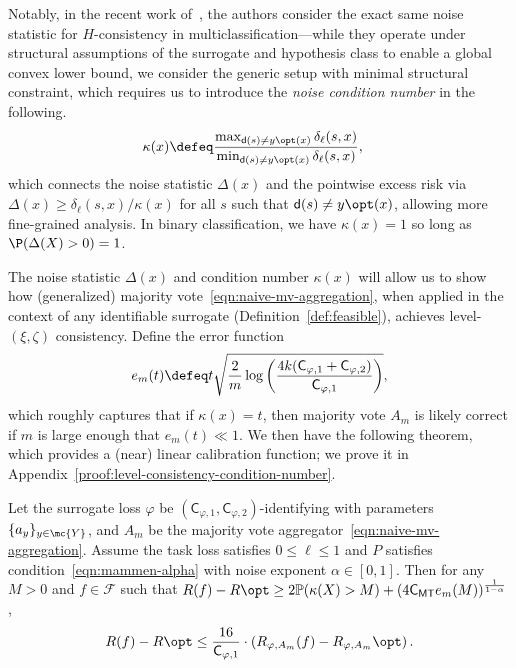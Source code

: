 \documentclass[11pt]{article}
\newcommand{\Prb}{\mathbb{P}}
\newcommand{\prn}[1]{\left({#1}\right)} %
\newcommand{\constant}{\mathsf{C}}  %
\newcommand{\cstMT}{\constant_{\mathsf{MT}}}
\newcommand{\pred}{\mathsf{d}}  %
\newcommand{\tloss}{\ell}  %
\newcommand{\sloss}{\varphi}  %
\newcommand{\extloss}{\delta_\tloss}
\begin{document}
Notably, in the
recent work of~\citet{MaoMoZh25}, the authors consider the exact same noise statistic
for $H$-consistency in multiclassification---while they operate under structural assumptions
of the surrogate and hypothesis class to enable a global convex lower bound, we consider
the generic setup with minimal structural constraint, which requires us to introduce the
\emph{noise condition number} in the following. 
% 
\begin{align}
  \label{eqn:noise-condition-number}
  \kappa(x) & \defeq
  \frac{\max_{\pred(s) \neq y\opt(x)} \extloss(s, x)}{
    \min_{\pred(s) \neq y\opt(x)} \extloss(s, x)},
\end{align}
which connects the noise statistic $\Delta(x)$ and the pointwise excess risk
via $\Delta(x)\geq \extloss(s, x)/ \kappa(x)$ for all $s$ such that
$\pred(s) \neq y\opt(x)$, allowing more fine-grained analysis.
%
In binary classification, we have $\kappa(x) = 1$ so long as $\P(\Delta(X) >
0) = 1$.


The noise statistic $\Delta(x)$ and condition number $\kappa(x)$ will allow
us to show how (generalized) majority vote~\eqref{eqn:naive-mv-aggregation},
when applied in the context of any identifiable surrogate
(Definition~\ref{def:feasible}), achieves level-$(\xi, \zeta)$ consistency.
%
Define the error function
\begin{align}
  \label{eq:error-function-mv}
  e_m(t) \defeq  t\sqrt{\frac{2}{m}\log \prn{
      \frac{4k(\constant_{\sloss, 1} + \constant_{\sloss, 2})}{
        \constant_{\sloss, 1}}}},
\end{align}
which roughly captures that if $\kappa(x) = t$, then
majority vote $A_m$ is likely correct if $m$ is large enough that
$e_m(t) \ll 1$.
%
We then have the following theorem, which provides a (near) linear
calibration function; we prove it in
Appendix~\ref{proof:level-consistency-condition-number}.
\begin{theorem}
  \label{thm:level-consistency-condition-number}
  Let the surrogate loss $\sloss$ be $(\constant_{\sloss, 1},
  \constant_{\sloss, 2})$-identifying with parameters $\{a_y\}_{y \in \mc{Y}}$,
  and $A_m$ be the majority vote aggregator~\eqref{eqn:naive-mv-aggregation}.
  Assume the task loss satisfies $0 \le \tloss \le 1$
  and $P$ satisfies condition~\eqref{eqn:mammen-alpha}
  with noise exponent $\alpha \in [0, 1]$.  
  Then for any $M > 0$ and $f \in \mathcal{F}$ such that $R(f) - R\opt \geq
  2\Prb(\kappa(X) > M) + (4\cstMT e_m(M))^{\frac{1}{1-\alpha}}$,
  \begin{align*}
    R(f) - R\opt \leq \frac{16}{\constant_{\sloss, 1}} \cdot \prn{R_{\sloss,{A_m}}(f) - R_{\sloss,{A_m}}\opt}.
  \end{align*} 
\end{theorem}
\end{document}
